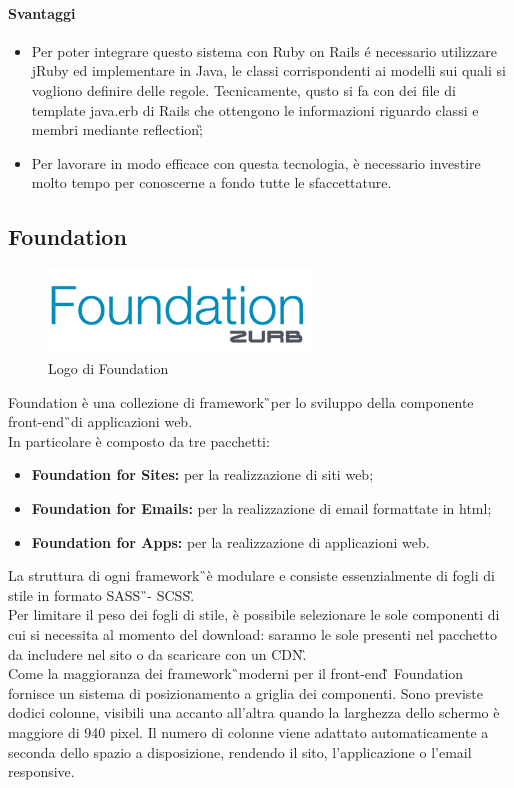 \paragraph{Svantaggi}
	\begin{itemize}
		\item Per poter integrare questo sistema con Ruby on Rails é necessario utilizzare jRuby ed implementare in Java, le classi corrispondenti ai modelli sui quali si vogliono definire delle regole. Tecnicamente, qusto si fa con dei file di template java.erb di Rails che ottengono le informazioni riguardo classi e membri mediante \gls{reflection}\G;
		\item Per lavorare in modo efficace con questa tecnologia, è necessario investire molto tempo per conoscerne a fondo tutte le sfaccettature.
	\end{itemize}
\subsection{Foundation}
		\begin{figure}[H]
			\begin{center}
				\includegraphics[width=7cm]{Pics/logo-foundation.png}
				\caption{Logo di Foundation}
				\label{fig:FoundationLogo}
			\end{center}
		\end{figure}
	Foundation è una collezione di \gls{framework}\G\ per lo sviluppo della componente \gls{front-end}\G\ di applicazioni web. \\ In particolare è composto da tre pacchetti:
	\begin{itemize}
		\item \textbf{Foundation for Sites: } per la realizzazione di siti web;
		\item \textbf{Foundation for Emails: } per la realizzazione di email formattate in html;
		\item \textbf{Foundation for Apps: } per la realizzazione di applicazioni web.
	\end{itemize}
	La struttura di ogni \gls{framework}\G\ è modulare e consiste essenzialmente di fogli di stile in formato \gls{SASS}\G\ - \gls{SCSS}\G. \\
	Per limitare il peso dei fogli di stile, è possibile selezionare  le sole componenti di cui si necessita al momento del download: saranno le sole presenti nel pacchetto da includere nel sito o da scaricare con un \gls{CDN}\G. \\
	Come la maggioranza dei \gls{framework}\G\ moderni per il \gls{front-end}\G\, Foundation fornisce un sistema di posizionamento a griglia dei componenti. Sono previste dodici colonne, visibili una accanto all'altra quando la larghezza dello schermo è maggiore di 940 pixel. Il numero di colonne viene adattato automaticamente a seconda dello spazio a disposizione, rendendo il sito, l'applicazione o l'email responsive. 
